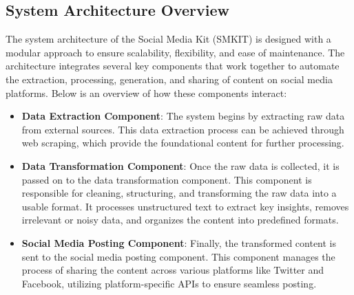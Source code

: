 \begin{itemize}

\end{itemize}

\subsection{System Architecture Overview}
\label{subsec:system_architecture_overview}
The system architecture of the Social Media Kit (SMKIT) is designed with a modular approach to ensure scalability, flexibility, and ease of maintenance. The architecture integrates several key components that work together to automate the extraction, processing, generation, and sharing of content on social media platforms. Below is an overview of how these components interact:

\begin{itemize}
    \item \textbf{Data Extraction Component}: The system begins by extracting raw data from external sources. This data extraction process can be achieved through web scraping, which provide the foundational content for further processing.

    \item \textbf{Data Transformation Component}: Once the raw data is collected, it is passed on to the data transformation component. This component is responsible for cleaning, structuring, and transforming the raw data into a usable format. It processes unstructured text to extract key insights, removes irrelevant or noisy data, and organizes the content into predefined formats.
    
    \item \textbf{Social Media Posting Component}: Finally, the transformed content is sent to the social media posting component. This component manages the process of sharing the content across various platforms like Twitter and Facebook, utilizing platform-specific APIs to ensure seamless posting.
\end{itemize}

